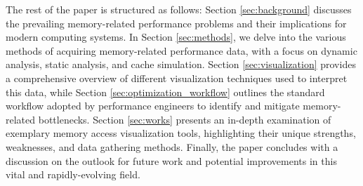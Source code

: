 The rest of the paper is structured as follows: Section \ref{sec:background} discusses the prevailing memory-related performance problems and their implications for modern computing systems. In Section \ref{sec:methods}, we delve into the various methods of acquiring memory-related performance data, with a focus on dynamic analysis, static analysis, and cache simulation. Section \ref{sec:visualization} provides a comprehensive overview of different visualization techniques used to interpret this data, while Section \ref{sec:optimization_workflow} outlines the standard workflow adopted by performance engineers to identify and mitigate memory-related bottlenecks. Section \ref{sec:works} presents an in-depth examination of exemplary memory access visualization tools, highlighting their unique strengths, weaknesses, and data gathering methods. Finally, the paper concludes with a discussion on the outlook for future work and potential improvements in this vital and rapidly-evolving field.